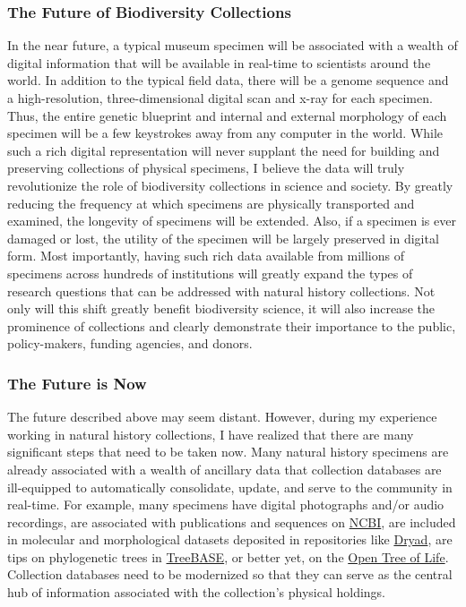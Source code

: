 \subsubsection*{The Future of Biodiversity Collections}
In the near future, a typical museum specimen will be associated
with a wealth of digital information that will be available in real-time
to scientists around the world.
In addition to the typical field data, there will be a genome sequence
and a high-resolution, three-dimensional digital scan and x-ray for each
specimen.
Thus, the entire genetic blueprint and internal and external morphology of 
each specimen will be a few keystrokes away from any computer in the world.
While such a rich digital representation will never supplant the need for
building and preserving collections of physical specimens, I believe the data
will truly revolutionize the role of biodiversity collections in science and
society.
By greatly reducing the frequency at which specimens are physically transported
and examined, the longevity of specimens will be extended.
Also, if a specimen is ever damaged or lost, the utility of the specimen will
be largely preserved in digital form.
Most importantly, having such rich data available from millions of specimens
across hundreds of institutions will greatly expand the types of research
questions that can be addressed with natural history collections.
Not only will this shift greatly benefit biodiversity science, it will also
increase the prominence of collections and clearly demonstrate their importance
to the public, policy-makers, funding agencies, and donors.


\subsubsection*{The Future is Now}
The future described above may seem distant.
However, during my experience working in natural history collections, I have
realized that there are many significant steps that need to be taken now.
Many natural history specimens are already associated with a wealth of ancillary
data that collection databases are ill-equipped to automatically consolidate,
update, and serve to the community in real-time.
For example, many specimens 
have digital photographs and/or audio recordings,
are associated with publications and sequences on
\href{http://www.ncbi.nlm.nih.gov}{NCBI}, are included in molecular and
morphological datasets deposited in repositories like
\href{http://datadryad.org}{Dryad}, are tips on phylogenetic trees in
\href{http://treebase.org}{TreeBASE}, or better yet, on the
\href{http://opentreeoflife.org}{Open Tree of Life}.
Collection databases need to be modernized so that they can serve
as the central hub of information associated with the collection's
physical holdings.

